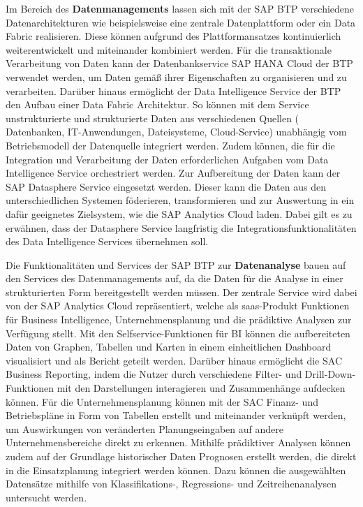 Im Bereich des \textbf{Datenmanagements} lassen sich mit der SAP BTP verschiedene Datenarchitekturen wie beispielsweise eine zentrale Datenplattform oder ein Data Fabric realisieren. Diese können aufgrund des Plattformansatzes kontinuierlich weiterentwickelt und miteinander kombiniert werden. Für die transaktionale Verarbeitung von Daten kann der Datenbankservice SAP HANA Cloud der BTP verwendet werden, um Daten gemäß ihrer Eigenschaften zu organisieren und zu verarbeiten. Darüber hinaus ermöglicht der Data Intelligence Service der BTP den Aufbau einer Data Fabric Architektur. \autocite[Vgl.][S. 64-66]{SEUBERT} So können mit dem Service unstrukturierte und strukturierte Daten aus verschiedenen Quellen ( Datenbanken, IT-Anwendungen, Dateisysteme, Cloud-Service) unabhängig vom Betriebsmodell der Datenquelle integriert werden. Zudem können, die für die Integration und Verarbeitung der Daten erforderlichen Aufgaben vom Data Intelligence Service orchestriert werden. \autocite[Vgl.][]{DATAINTELLIGENCE} Zur Aufbereitung der Daten kann der SAP Datasphere Service eingesetzt werden. Dieser kann die Daten aus den unterschiedlichen Systemen föderieren, transformieren und zur Auswertung in ein dafür geeignetes Zielsystem, wie die SAP Analytics Cloud laden. \autocite[Vgl.][S. 3]{FSDDATASPHERE}  Dabei gilt es zu erwähnen, dass der Datasphere Service langfristig die Integrationsfunktionalitäten des Data Intelligence Services übernehmen soll. \autocite[Vgl.][]{QUIRK2023}

Die Funktionalitäten und Services der SAP BTP zur \textbf{Datenanalyse} bauen auf den Services des Datenmanagements auf, da die Daten für die Analyse in einer strukturierten Form bereitgestellt werden müssen. Der zentrale Service wird dabei von der SAP Analytics Cloud repräsentiert, welche als \ac{saas}-Produkt Funktionen für Business Intelligence, Unternehmensplanung und die prädiktive Analysen zur Verfügung stellt. Mit den Selfservice-Funktionen für BI können die aufbereiteten Daten von Graphen, Tabellen und Karten in einem einheitlichen Dashboard visualisiert und als Bericht geteilt werden. Darüber hinaus ermöglicht die SAC Business Reporting, indem die Nutzer durch verschiedene Filter- und Drill-Down-Funktionen mit den Darstellungen interagieren und Zusammenhänge aufdecken können. Für die Unternehmensplanung können mit der SAC Finanz- und Betriebspläne in Form von Tabellen erstellt und miteinander verknüpft werden, um Auswirkungen von veränderten Planungseingaben auf andere Unternehmensbereiche direkt zu erkennen. Mithilfe prädiktiver Analysen können zudem auf der Grundlage historischer Daten Prognosen erstellt werden, die direkt in die Einsatzplanung integriert werden können. \autocite[Vgl.][S. 64-67]{SEUBERT} Dazu können die ausgewählten Datensätze mithilfe von Klassifikations-, Regressions- und Zeitreihenanalysen untersucht werden. \autocite[Vgl.][]{FSDSAC2023}


